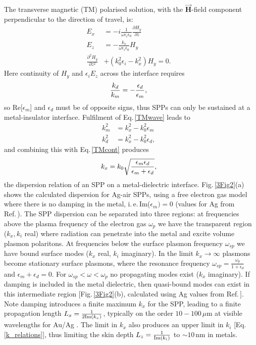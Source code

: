 The transverse magnetic (TM) polarised solution, with the $\vec{\mathbf{H}}$-field component perpendicular to the direction of travel, is:
\begin{subequations}
\label{TMplasmons}
\begin{align}
E_x &= -i \frac{1}{\omega \epsilon_i \epsilon_0} \frac{\partial H_y}{\partial z}\\
E_z &= -\frac{k_x}{\omega \epsilon_i \epsilon_0} H_y\\
\frac{\partial^2 H_y}{\partial z^2} &+ (k_0^2 \epsilon_i-k_x^2)H_y = 0 \label{TMwave}.
\end{align}
\end{subequations}
Here continuity of $H_y$ and $\epsilon_i E_z$ across the interface requires
\begin{equation}
\centering
\frac{k_d}{k_m} = -\frac{\epsilon_d}{\epsilon_m} ,
\label{TMcont}
\end{equation}
so Re[$\epsilon_m$] and $\epsilon_d$ must be of opposite signs, thus SPPs can only be sustained at a metal-insulator interface. Fulfilment of Eq.\,\ref{TMwave} leads to 
\begin{subequations}
\label{k_relations}
\begin{align}
k_m^2 &= k_x^2-k_0^2\epsilon_m\\
k_d^2 &= k_x^2-k_0^2\epsilon_d ,
\end{align}
\end{subequations}
and combining this with Eq.\,\ref{TMcont} produces
\begin{equation}
\centering
k_x = k_0\sqrt{\frac{\epsilon_m \epsilon_d}{\epsilon_m + \epsilon_d}} ,
\label{SPPdispersion}
\end{equation}
the dispersion relation of an SPP on a metal-dielectric interface. Fig.\,\ref{3Fig2}(a) shows the calculated dispersion for Ag-air SPPs, using a free electron gas model where there is no damping in the metal, i.\,e.\,Im($\epsilon_m)=0$ (values for Ag from Ref.\,\cite{Zeman1987}). The SPP dispersion can be separated into three regions: at frequencies above the plasma frequency of the electron gas $\omega_p$ we have the transparent region ($k_x, k_i$ real) where radiation can penetrate into the metal and excite volume plasmon polaritons. At frequencies below the surface plasmon frequency $\omega_{sp}$ we have bound surface modes ($k_x$ real, $k_i$ imaginary). In the limit $k_x\rightarrow \infty$ plasmons become stationary surface plasmons, where the resonance frequency $\omega_{sp} = \frac{\omega_p}{1+\epsilon_d}$ and $\epsilon_m+\epsilon_d=0$. For $\omega_{sp}<\omega<\omega_p$ no propagating modes exist ($k_x$ imaginary). If damping is included in the metal dielectric, then quasi-bound modes can exist in this intermediate region [Fig.\,\ref{3Fig2}(b), calculated using Ag values from Ref.\,\cite{Johnson1972}]. Note damping introduces a finite maximum $k_x$ for the SPP, leading to a finite propagation length $L_x = \frac{1}{2\textnormal{Im}(k_x)}$, typically on the order $10-100\,\mu$m at visible wavelengths for Au/Ag \cite{Maier2007}. The limit in $k_x$ also produces an upper limit in $k_i$ [Eq.\,\ref{k_relations}], thus limiting the skin depth $L_z = \frac{1}{\textnormal{Im}(k_i)}$ to $\sim10$\,nm in metals. 
